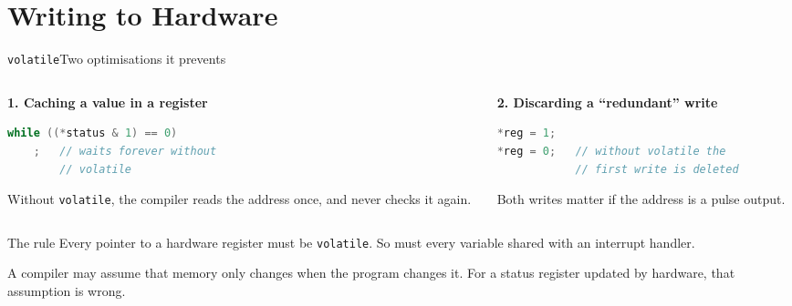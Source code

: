 \documentclass[9pt,aspectratio=169,xcolor=table]{beamer}
\begin{document}
\section{Writing to Hardware}

\begin{frame}[fragile]{\texttt{volatile}}{Two optimisations it prevents}
    \begin{columns}[T]
    \begin{column}{.5\textwidth}
        \textbf{1. Caching a value in a register}

        \vspace{1mm}
\begin{lstlisting}[language=C, basicstyle=\ttfamily\footnotesize]
while ((*status & 1) == 0)
    ;   // waits forever without
        // volatile
\end{lstlisting}

        \vspace{2mm}
        {\small Without \texttt{volatile}, the compiler reads the
        address once, and never checks it again.}
    \end{column}
    \begin{column}{.46\textwidth}
        \textbf{2. Discarding a ``redundant'' write}

        \vspace{1mm}
\begin{lstlisting}[language=C, basicstyle=\ttfamily\footnotesize]
*reg = 1;
*reg = 0;   // without volatile the
            // first write is deleted
\end{lstlisting}

        \vspace{2mm}
        {\small Both writes matter if the address is a \alert{pulse
        output}.}
    \end{column}
    \end{columns}

    \vspace{3mm}
    \begin{block}{The rule}
        \alert{Every pointer to a hardware register must be
        \texttt{volatile}. So must every variable shared with an
        interrupt handler.}

        \vspace{1mm}
        A compiler may assume that memory only changes when the
        program changes it. For a status register updated by
        hardware, that assumption is wrong.
    \end{block}
\end{frame}
\end{document}
